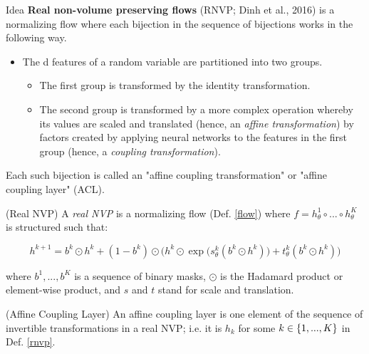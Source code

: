 \documentclass[10pt]{beamer}
\begin{document}
\begin{frame}{Idea}
 \textbf{Real non-volume preserving flows} (RNVP; Dinh et al., 2016) is a normalizing flow where  each bijection in the sequence of bijections works in the following way. 
 
 \begin{itemize}
 \item The d features of a random variable are partitioned into two groups.   \pause 
	 \begin{itemize}
	 \item The first  group is transformed by the identity transformation. \pause
	 \item The second group is transformed by a more complex operation whereby its values are scaled and translated (hence, an \textit{affine transformation}) by factors created by applying neural networks to the features in the first group (hence, a \textit{coupling transformation}).  \pause
	 \end{itemize}

 \end{itemize}
\vfill
Each such bijection is called an "affine coupling transformation" or "affine coupling layer" (ACL).
\end{frame}


\begin{frame}
\begin{definition}{(Real NVP)} \label{rnvp}
A \textit{real NVP} is a normalizing flow (Def. \ref{flow}) where $f=h_\theta^1 \circ ... \circ h_\theta^K$ is structured such that:

\[h^{k+1} = b^k \odot h^k + (1-b^k) \odot \bigg( h^k \odot \exp \big( s^k_\theta(b^k \odot h^k) \big) + t^k _\theta(b^k \odot h^k ) \bigg)  \]
 
where $b^1, ..., b^K$ is a sequence of binary masks, $\odot$ is the Hadamard product or element-wise product, and $s$ and $t$ stand for scale and translation. %
\end{definition}


\begin{definition}{(Affine Coupling Layer)} \label{acl}
An affine coupling layer is one element of the sequence of invertible transformations in a real NVP; i.e. it is $h_k $ for some $k  \in \{ {1,...,K} \}$ in Def. \ref{rnvp}. 
\end{definition}
\end{frame}
\end{document}
